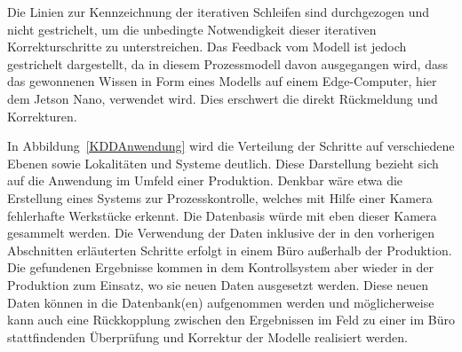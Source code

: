 Die Linien zur Kennzeichnung der iterativen Schleifen sind durchgezogen und nicht gestrichelt, um die unbedingte Notwendigkeit dieser iterativen Korrekturschritte zu unterstreichen. Das Feedback vom Modell ist jedoch gestrichelt dargestellt, da in diesem Prozessmodell davon ausgegangen wird, dass das gewonnenen Wissen in Form eines Modells auf einem Edge-Computer, hier dem Jetson Nano, verwendet wird. Dies erschwert die direkt Rückmeldung und Korrekturen.

In Abbildung~\ref{KDDAnwendung} wird die Verteilung der Schritte auf verschiedene Ebenen sowie Lokalitäten und Systeme deutlich. Diese Darstellung bezieht sich auf die Anwendung im Umfeld einer Produktion. Denkbar wäre etwa die Erstellung eines Systems zur Prozesskontrolle, welches mit Hilfe einer Kamera fehlerhafte Werkstücke erkennt. Die Datenbasis würde mit eben dieser Kamera gesammelt werden. Die Verwendung der Daten inklusive der in den vorherigen
Abschnitten erläuterten Schritte erfolgt in einem Büro außerhalb der Produktion. Die gefundenen Ergebnisse kommen in dem Kontrollsystem aber wieder in der
Produktion zum Einsatz, wo sie neuen Daten ausgesetzt werden. Diese neuen Daten können in die Datenbank(en) aufgenommen werden und möglicherweise kann
auch eine Rückkopplung zwischen den Ergebnissen im Feld zu einer im Büro stattfindenden Überprüfung und Korrektur der Modelle realisiert werden.

